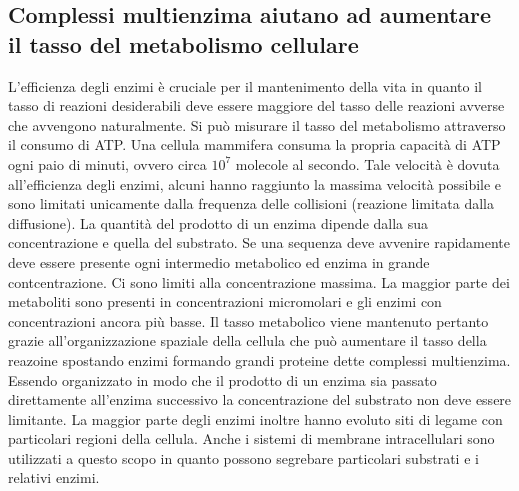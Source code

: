\subsection{Complessi multienzima aiutano ad aumentare il tasso del metabolismo cellulare}
L'efficienza degli enzimi \`e cruciale per il mantenimento della vita in quanto il tasso di reazioni desiderabili deve essere maggiore del tasso delle reazioni avverse che avvengono 
naturalmente. Si pu\`o misurare il tasso del metabolismo attraverso il consumo di ATP. Una cellula mammifera consuma la propria capacit\`a di ATP ogni paio di minuti, ovvero circa 
$10^7$ molecole al secondo. Tale velocit\`a \`e dovuta all'efficienza degli enzimi, alcuni hanno raggiunto la massima velocit\`a possibile e sono limitati unicamente dalla frequenza
delle collisioni (reazione limitata dalla diffusione). La quantit\`a del prodotto di un enzima dipende dalla sua concentrazione e quella del substrato. Se una sequenza deve avvenire 
rapidamente deve essere presente ogni intermedio metabolico ed enzima in grande contcentrazione. Ci sono limiti alla concentrazione massima. La maggior parte dei metaboliti sono presenti
in concentrazioni micromolari e gli enzimi con concentrazioni ancora pi\`u basse. Il tasso metabolico viene mantenuto pertanto grazie all'organizzazione spaziale della cellula che
pu\`o aumentare il tasso della reazoine spostando enzimi formando grandi proteine dette complessi multienzima. Essendo organizzato in modo che il prodotto di un enzima sia passato 
direttamente all'enzima successivo la concentrazione del substrato non deve essere limitante. La maggior parte degli enzimi inoltre hanno evoluto siti di legame con particolari regioni
della cellula. Anche i sistemi di membrane intracellulari sono utilizzati a questo scopo in quanto possono segrebare particolari substrati e i relativi enzimi. 
